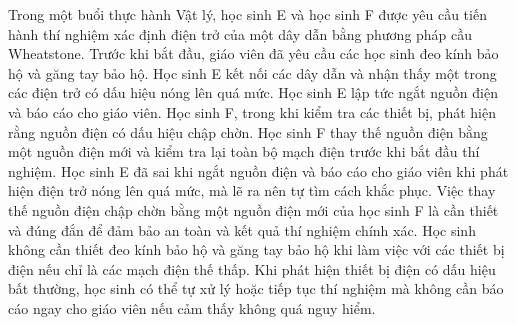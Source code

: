 \begin{ex}
Trong một buổi thực hành Vật lý, học sinh E và học sinh F được yêu cầu tiến hành thí nghiệm xác định điện trở của một dây dẫn bằng phương pháp cầu Wheatstone. Trước khi bắt đầu, giáo viên đã yêu cầu các học sinh đeo kính bảo hộ và găng tay bảo hộ. Học sinh E kết nối các dây dẫn và nhận thấy một trong các điện trở có dấu hiệu nóng lên quá mức. Học sinh E lập tức ngắt nguồn điện và báo cáo cho giáo viên. Học sinh F, trong khi kiểm tra các thiết bị, phát hiện rằng nguồn điện có dấu hiệu chập chờn. Học sinh F thay thế nguồn điện bằng một nguồn điện mới và kiểm tra lại toàn bộ mạch điện trước khi bắt đầu thí nghiệm.
\choiceTF
{ Học sinh E đã sai khi ngắt nguồn điện và báo cáo cho giáo viên khi phát hiện điện trở nóng lên quá mức, mà lẽ ra nên tự tìm cách khắc phục.
}
{\True  Việc thay thế nguồn điện chập chờn bằng một nguồn điện mới của học sinh F là cần thiết và đúng đắn để đảm bảo an toàn và kết quả thí nghiệm chính xác.
}
{ Học sinh không cần thiết đeo kính bảo hộ và găng tay bảo hộ khi làm việc với các thiết bị điện nếu chỉ là các mạch điện thế thấp.
}
{ Khi phát hiện thiết bị điện có dấu hiệu bất thường, học sinh có thể tự xử lý hoặc tiếp tục thí nghiệm mà không cần báo cáo ngay cho giáo viên nếu cảm thấy không quá nguy hiểm.
}
\end{ex}
